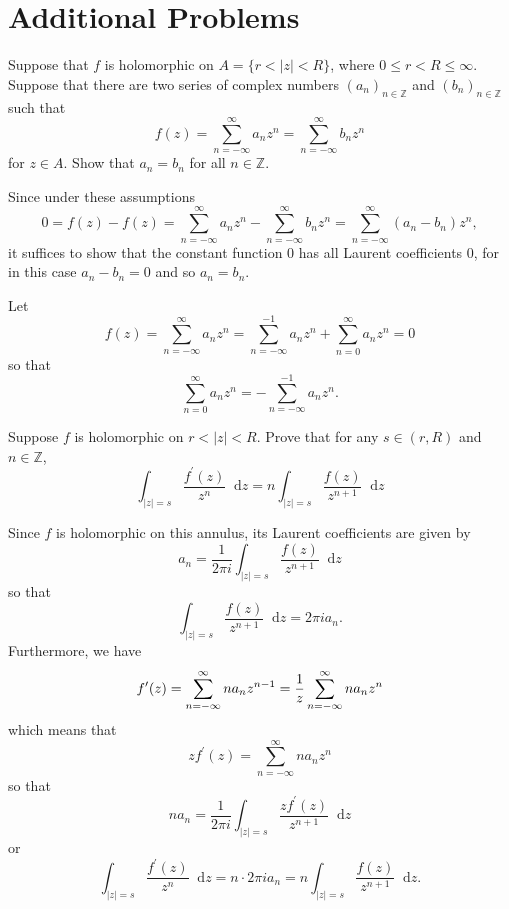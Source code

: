 \documentclass{article}
\newcommand\dif{\mathop{}\!\mathrm{d}}
\newcounter{Problem}
\newenvironment{Problem}{\begin{Exercise}[name={Problem},
                                          counter={Problem}]}
                        {\end{Exercise}}
\begin{document}
\section{Additional Problems}

\begin{Problem}
Suppose that $f$ is holomorphic on 
$A = \{ r < |z| < R \}$, where $0 \leq r < R \leq \infty$.
Suppose that there are two series of complex numbers 
$(a_n)_{n \in \mathbb{Z}}$ and $(b_n)_{n \in \mathbb{Z}}$ such that
$$
f(z) = \sum_{n=-\infty}^\infty a_n z^n = \sum_{n=-\infty}^\infty b_n z^n
$$
for $z \in A$. Show that $a_n = b_n$ for all $n \in \mathbb{Z}$.
\end{Problem}

\begin{Answer}
Since under these assumptions
$$
  0 
= f(z) - f(z) 
= \sum_{n=-\infty}^\infty a_n z^n - \sum_{n=-\infty}^\infty b_n z^n
= \sum_{n=-\infty}^\infty (a_n - b_n) z^n,
$$
it suffices to show that the constant function 0 has all
Laurent coefficients 0, for in this case $a_n - b_n = 0$ and
so $a_n = b_n$.

Let
$$
  f(z) 
= \sum_{n=-\infty}^\infty a_n z^n 
= \sum_{n=-\infty}^{-1} a_n z^n
+ \sum_{n=0}^\infty a_n z^n
= 0
$$
so that
$$
   \sum_{n=0}^\infty a_n z^n 
= -\sum_{n=-\infty}^{-1} a_n z^n.
$$

\end{Answer}

\begin{Problem}
Suppose $f$ is holomorphic on $r < |z| < R$. Prove that for any
$s \in (r, R)$ and $n \in \mathbb{Z}$,
$$
   \int_{|z| = s} \frac{f^\prime(z)}{z^n} \dif z
= n\int_{|z| = s} \frac{f(z)}{z^{n+1}} \dif z
$$
\end{Problem}

\begin{Answer}
Since $f$ is holomorphic on this annulus, its Laurent
coefficients are given by
$$
  a_n 
= \frac{1}{2 \pi i} 
  \int_{|z| = s}
    \frac{f(z)}{z^{n+1}}
    \dif z
$$
so that
$$
\int_{|z| = s}
    \frac{f(z)}{z^{n+1}}
    \dif z
= 2 \pi i a_n.
$$
Furthermore, we have
$$
   f^\prime(z)
= \sum_{n=-\infty}^\infty n a_n z^{n-1} \\
= \frac{1}{z} \sum_{n=-\infty}^{\infty} n a_n z^n 
$$
which means that
$$
z f^\prime(z) = \sum_{n=-\infty}^\infty n a_n z^n
$$
so that
$$
  n a_n 
= \frac{1}{2 \pi i}
  \int_{|z| = s}
    \frac{z f^\prime(z)}{z^{n+1}}
    \dif z
$$
or
$$
  \int_{|z| = s}
    \frac{f^\prime(z)}{z^n}
    \dif z
= n \cdot 2 \pi i a_n
= n \int_{|z| = s}
      \frac{f(z)}{z^{n+1}}
      \dif z.
$$

\end{Answer}
\end{document}
